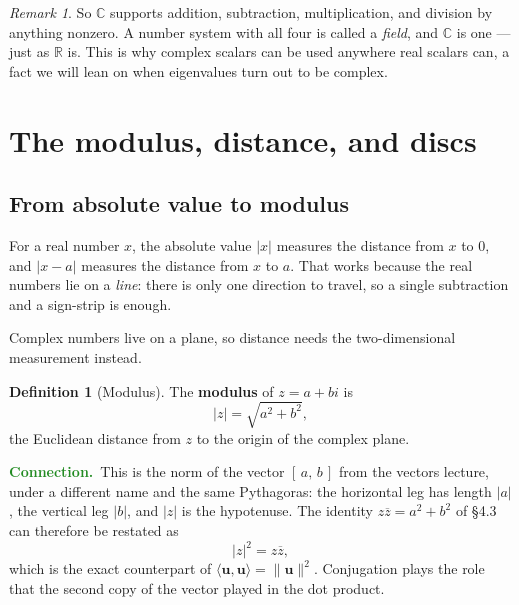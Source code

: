 \documentclass[11pt]{article}
\theoremstyle{definition}
\newtheorem{defn}{Definition}
\theoremstyle{remark}
\newtheorem*{rmk}{Remark}
\newcommand{\lookback}{\par\smallskip\noindent
  \textbf{\sffamily\textcolor{ForestGreen}{Connection.}}\ \ignorespaces}
\newcommand{\R}{\mathbb{R}}
\newcommand{\C}{\mathbb{C}}
\newcommand{\vc}[1]{\mathbf{#1}}
\newcommand{\norm}[1]{\lVert #1\rVert}
\newcommand{\conj}[1]{\overline{#1}}
\newcommand{\Rez}{\operatorname{Re}}
\newcommand{\Imz}{\operatorname{Im}}
\newcommand{\cplane}[4]{%
  \draw[step=1cm,gray!25,very thin] (#1,#3) grid (#2,#4);
  \draw[axisline] (#1,0) -- (#2+0.55,0)
        node[right,font=\scriptsize,black]{$\Rez$};
  \draw[axisline] (0,#3) -- (0,#4+0.55)
        node[above,font=\scriptsize,black]{$\Imz$};
}
\newcommand{\cpoint}[5]{%
  \fill[#3] (#1,#2) circle (2.1pt);
  \node[#5,font=\scriptsize,#3] at (#1,#2) {#4};
}
\begin{document}
\begin{rmk}
So $\C$ supports addition, subtraction, multiplication, and division by anything
nonzero. A number system with all four is called a \emph{field}, and $\C$ is one
--- just as $\R$ is. This is why complex scalars can be used anywhere real
scalars can, a fact we will lean on when eigenvalues turn out to be complex.
\end{rmk}

\section{The modulus, distance, and discs}
\subsection{From absolute value to modulus}
For a real number $x$, the absolute value $\lvert x\rvert$ measures the distance
from $x$ to $0$, and $\lvert x-a\rvert$ measures the distance from $x$ to $a$.
That works because the real numbers lie on a \emph{line}: there is only one
direction to travel, so a single subtraction and a sign-strip is enough.

Complex numbers live on a plane, so distance needs the two-dimensional
measurement instead.

\begin{defn}[Modulus]
The \textbf{modulus} of $z=a+bi$ is
\[
  \lvert z\rvert = \sqrt{a^{2}+b^{2}} ,
\]
the Euclidean distance from $z$ to the origin of the complex plane.
\end{defn}

\lookback This is the norm of the vector $[\,a,\,b\,]$ from the vectors lecture,
under a different name and the same Pythagoras: the horizontal leg has length
$\lvert a\rvert$, the vertical leg $\lvert b\rvert$, and $\lvert z\rvert$ is the
hypotenuse. The identity $z\conj{z}=a^{2}+b^{2}$ of \S4.3 can therefore be
restated as
\[
  \lvert z\rvert^{2} = z\conj{z} ,
\]
which is the exact counterpart of $\langle \vc{u},\vc{u}\rangle=\norm{\vc{u}}^{2}$.
Conjugation plays the role that the second copy of the vector played in the dot
product.

\begin{center}
\end{center}
\end{document}
